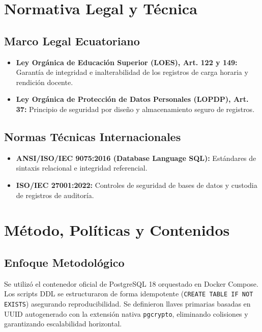 \documentclass[12pt,a4paper]{article}
\begin{document}
\section{Normativa Legal y Técnica}
\subsection{Marco Legal Ecuatoriano}
\begin{itemize}[leftmargin=1.5em, itemsep=2pt]
    \item \textbf{Ley Orgánica de Educación Superior (LOES), Art. 122 y 149:} Garantía de integridad e inalterabilidad de los registros de carga horaria y rendición docente.
    \item \textbf{Ley Orgánica de Protección de Datos Personales (LOPDP), Art. 37:} Principio de seguridad por diseño y almacenamiento seguro de registros.
\end{itemize}
\subsection{Normas Técnicas Internacionales}
\begin{itemize}[leftmargin=1.5em, itemsep=2pt]
    \item \textbf{ANSI/ISO/IEC 9075:2016 (Database Language SQL):} Estándares de sintaxis relacional e integridad referencial.
    \item \textbf{ISO/IEC 27001:2022:} Controles de seguridad de bases de datos y custodia de registros de auditoría.
\end{itemize}

\section{Método, Políticas y Contenidos}
\subsection{Enfoque Metodológico}
Se utilizó el contenedor oficial de PostgreSQL 18 orquestado en Docker Compose. Los scripts DDL se estructuraron de forma idempotente (\texttt{CREATE TABLE IF NOT EXISTS}) asegurando reproducibilidad. Se definieron llaves primarias basadas en UUID autogenerado con la extensión nativa \texttt{pgcrypto}, eliminando colisiones y garantizando escalabilidad horizontal.
\end{document}
